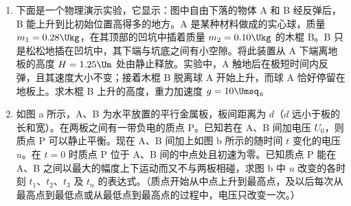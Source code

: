 \documentclass[\gkver]{gaokaozhenti}
\begin{document}
\begin{enumerate}


\item
下面是一个物理演示实验，它显示：图中自由下落的物体 A 和 B 经反弹后，B 能上升到比初始位置高得多的地方。A 是某种材料做成的实心球，质量 $m_{1}=0.28\Ukg$，在其顶部的凹坑中插着质量 $m_{2}=0.10\Ukg$ 的木棍 B。B 只是松松地插在凹坑中，其下端与坑底之间有小空隙。将此装置从 A 下端离地板的高度 $H=1.25\Um$ 处由静止释放。实验中，A 触地后在极短时间内反弹，且其速度大小不变；接着木棍 B 脱离球 A 开始上升，而球 A 恰好停留在地板上。求木棍 B 上升的高度，重力加速度 $g=10\Umsq$。




\item
如图 a 所示，A、B 为水平放置的平行金属板，板间距离为 $d$（$d$ 远小于板的长和宽）。在两板之间有一带负电的质点 P。已知若在 A、B 间加电压 $U_{0}$，则质点 P 可以静止平衡。现在 A、B 间加上如图 b 所示的随时间 $t$ 变化的电压 $u$。在 $t=0$ 时质点 P 位于 A、B 间的中点处且初速为零。已知质点 P 能在 A、B 之间以最大的幅度上下运动而又不与两板相碰，求图 b 中 $u$ 改变的各时刻 $t_{1}$、$t_{2}$、$t_{3}$ 及 $t_{n}$ 的表达式。（质点开始从中点上升到最高点，及以后每次从最高点到最低点或从最低点到最高点的过程中，电压只改变一次。）


\end{enumerate}
\end{document}
